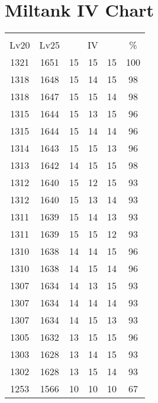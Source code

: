\documentclass{article}%
\begin{document}
%
\normalsize%
\section{Miltank IV Chart}%
\label{sec:Miltank IV Chart}%
\renewcommand{\arraystretch}{1.5}%
\begin{tabular}{|c|c|c|c|c|c|}%
\hline%
\multicolumn{6}{|c|}{\textcolor{white}{ 
\linebreak{Miltank}
}%
\cellcolor{black}}\\%
\multicolumn{1}{|c}{Lv20}&\multicolumn{1}{c|}{Lv25}&\multicolumn{3}{c|}{IV}&\multicolumn{1}{|c|}{\%}\\%
\hline%
\rowcolor{color100}%
1321&1651&15&15&15&100\\%
\hline%
\rowcolor{color98}%
1318&1648&15&14&15&98\\%
\hline%
\rowcolor{color98}%
1318&1647&15&15&14&98\\%
\hline%
\rowcolor{color96}%
1315&1644&15&13&15&96\\%
\hline%
\rowcolor{color96}%
1315&1644&15&14&14&96\\%
\hline%
\rowcolor{color96}%
1314&1643&15&15&13&96\\%
\hline%
\rowcolor{color98}%
1313&1642&14&15&15&98\\%
\hline%
\rowcolor{color93}%
1312&1640&15&12&15&93\\%
\hline%
\rowcolor{color93}%
1312&1640&15&13&14&93\\%
\hline%
\rowcolor{color93}%
1311&1639&15&14&13&93\\%
\hline%
\rowcolor{color93}%
1311&1639&15&15&12&93\\%
\hline%
\rowcolor{color96}%
1310&1638&14&14&15&96\\%
\hline%
\rowcolor{color96}%
1310&1638&14&15&14&96\\%
\hline%
\rowcolor{color93}%
1307&1634&14&13&15&93\\%
\hline%
\rowcolor{color93}%
1307&1634&14&14&14&93\\%
\hline%
\rowcolor{color93}%
1307&1634&14&15&13&93\\%
\hline%
\rowcolor{color96}%
1305&1632&13&15&15&96\\%
\hline%
\rowcolor{color93}%
1303&1628&13&14&15&93\\%
\hline%
\rowcolor{color93}%
1302&1628&13&15&14&93\\%
\hline%
\rowcolor{color91}%
1253&1566&10&10&10&67\\%
\end{tabular}

%
\end{document}
